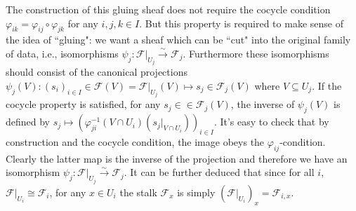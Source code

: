\documentclass[12pt]{article}
\theoremstyle{remark}
\begin{document}
	The construction of this gluing sheaf does not require the cocycle condition $\varphi_{ik}=\varphi_{ij}\circ\varphi_{jk}$ for any $i,j,k\in I$. But this property is required to make sense of the idea of ``gluing": we want a sheaf which can be ``cut" into the original family of data, i.e., isomorphisms $\psi_j:\mathscr F|_{U_j}\xrightarrow{\sim}\mathscr F_j$. Furthermore these isomorphisms should consist of the canonical projections $\psi_j(V):(s_i)_{i\in I}\in\mathscr F(V)=\mathscr F|_{U_j}(V)\mapsto s_j\in\mathscr F_j(V)$ where $V\subseteq U_j$. If the cocycle property is satisfied, for any $s_j\in \in\mathscr F_j(V)$, the inverse of $\psi_j(V)$ is defined by $s_j\mapsto \left(\varphi_{ji}^{-1}(V\cap U_i)(s_j|_{V\cap U_i})\right)_{i\in I}$. It's easy to check that by construction and the cocycle condition, the image obeys the $\varphi_{ij}$-condition. Clearly the latter map is the inverse of the projection and therefore we have an isomorphism $\psi_j:\mathscr F|_{U_j}\xrightarrow{\sim}\mathscr F_j$. It can be further deduced that since for all $i$, $\mathscr F|_{U_i}\cong\mathscr F_i$, for any $x\in U_i$ the stalk $\mathscr F_x$ is simply $(\mathscr F|_{U_i})_x=\mathscr F_{i, x}$.
	
\end{document}
